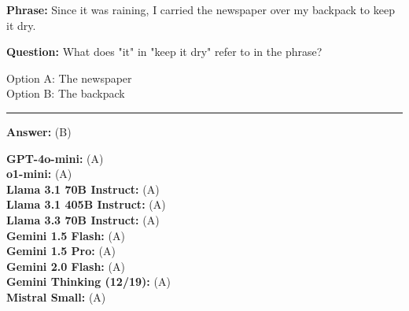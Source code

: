 \begin{tcolorbox}[colback=gray!3, colframe=gray!50, arc=2mm, boxrule=0.5pt, title={\textit{Winograd}}, coltitle=black, colbacktitle=gray!20]  
    
    \textbf{Phrase:} Since it was raining, I carried the newspaper over my backpack to keep it dry.
    
    \medskip

    \textbf{Question:} What does "it" in "keep it dry" refer to in the phrase?

    \medskip

    Option A: The newspaper \\
    Option B: The backpack

    \noindent
    \begin{center}
        \rule{0.9\textwidth}{0.4pt}
    \end{center}
    
    \textbf{Answer:} (B)

    \medskip

    \textbf{GPT-4o-mini:} (A) \\
    \textbf{o1-mini:} (A) \\
    \textbf{Llama 3.1 70B Instruct:} (A) \\
    \textbf{Llama 3.1 405B Instruct:} (A) \\
    \textbf{Llama 3.3 70B Instruct:} (A) \\
    \textbf{Gemini 1.5 Flash:} (A) \\
    \textbf{Gemini 1.5 Pro:} (A) \\
    \textbf{Gemini 2.0 Flash:} (A) \\
    \textbf{Gemini Thinking (12/19):} (A) \\
    \textbf{Mistral Small:} (A)


\end{tcolorbox}
\vspace{\baselineskip}


